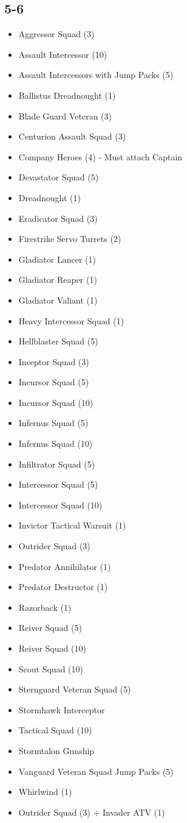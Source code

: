 \documentclass{HordeModeTarot}
\begin{document}
\begin{multicols}{2}
\subsection*{5-6}
\begin{itemize}[leftmargin=*]
\item[] Aggressor Squad (3)
\item[] Assault Intercessor (10)
\item[] Assault Intercessors with Jump Packs (5)
\item[] Ballistus Dreadnought (1)
\item[] Blade Guard Veteran (3)
\item[] Centurion Assault Squad (3)
\item[] Company Heroes (4) - Must attach Captain
\item[] Devastator Squad (5)
\item[] Dreadnought (1)
\item[] Eradicator Squad (3)
\item[] Firestrike Servo Turrets (2)
\item[] Gladiator Lancer (1)
\item[] Gladiator Reaper (1)
\item[] Gladiator Valiant (1)
\item[] Heavy Intercessor Squad (1)
\item[] Hellblaster Squad (5)
\item[] Inceptor Squad (3)
\item[] Incursor Squad (5)
\item[] Incursor Squad (10)
\item[] Infernus Squad (5)
\item[] Infernus Squad (10)
\item[] Infiltrator Squad (5)
\item[] Intercessor Squad (5)
\item[] Intercessor Squad (10)
\item[] Invictor Tactical Warsuit (1)
\item[] Outrider Squad (3)
\item[] Predator Annihilator (1)
\item[] Predator Destructor (1)
\item[] Razorback (1)
\item[] Reiver Squad (5)
\item[] Reiver Squad (10)
\item[] Scout Squad (10)
\item[] Sternguard Veteran Squad (5)
\item[] Stormhawk Interceptor
\item[] Tactical Squad (10)
\item[] Stormtalon Gunship
\item[] Vanguard Veteran Squad Jump Packs (5)
\item[] Whirlwind (1)
\item[] Outrider Squad (3) + Invader ATV (1)
\end{itemize}


\end{multicols}
\end{document}
